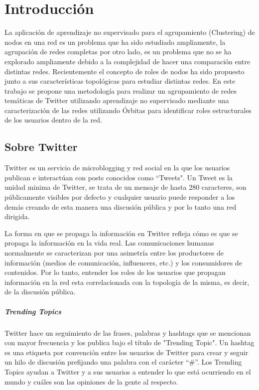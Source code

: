 \chapter{Introducción}
\label{sec:intro}

La aplicación de aprendizaje no supervisado para el agrupamiento (Clustering) de nodos en una red es un problema que ha sido estudiado ampliamente, la agrupación de redes completas por otro lado, es un problema que no se ha explorado ampliamente debido a la complejidad de hacer una comparación entre distintas redes. Recientemente el concepto de roles de nodos ha sido propuesto junto a sus características topológicas para estudiar distintas redes. En este trabajo se propone una metodología para realizar un agrupamiento de redes temáticas de Twitter utilizando aprendizaje no supervisado mediante una caracterización de las redes utilizando Órbitas para identificar roles estructurales de los usuarios dentro de la red.


\section{Sobre Twitter}
\label{sec:organización}

Twitter es un servicio de microblogging y red social en la que los usuarios publican e interactúan con posts conocidos como “Tweets". \cite{twitter} Un Tweet es la unidad minima de Twitter, se trata de un mensaje de hasta 280 caracteres, son públicamente visibles por defecto y cualquier usuario puede responder a los demás creando de esta manera una discusión pública y por lo tanto una red dirigida.

La forma en que se propaga la información en Twitter refleja cómo es que se propaga la información en la vida real. Las comunicaciones humanas normalmente se caracterizan por una asimetría entre los productores de información (medios de comunicación, influencers, etc.) y los consumidores de contenidos. \cite{gabielkov_studying_2014} Por lo tanto, entender los roles de los usuarios que propagan información en la red esta correlacionada con la topología de la misma, es decir, de la discusión pública.

\paragraph{Trending Topics}

Twitter hace un seguimiento de las frases, palabras y hashtags que se mencionan con mayor frecuencia y los publica bajo el título de "Trending Topic". Un hashtag es una etiqueta por convención entre los usuarios de Twitter para crear y seguir un hilo de discusión prefijando una palabra con el carácter “\#”. Los Trending Topics ayudan a Twitter y a sus usuarios a entender lo que está ocurriendo en el mundo y cuáles son las opiniones de la gente al respecto. \cite{twitter}

